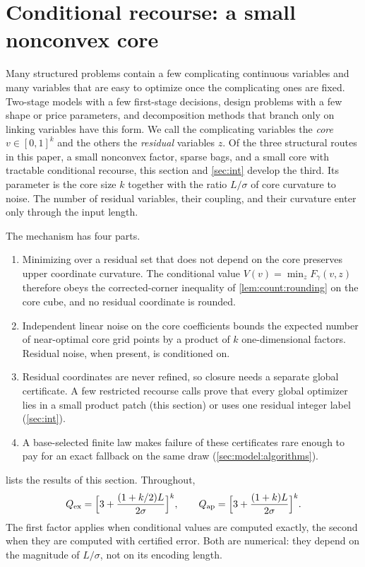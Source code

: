 \section{Conditional recourse: a small nonconvex core}\label{sec:rec}

Many structured problems contain a few complicating continuous variables
and many variables that are easy to optimize once the complicating ones are
fixed. Two-stage models with a few first-stage decisions, design problems
with a few shape or price parameters, and decomposition methods that branch
only on linking variables have this form. We call the complicating variables
the \emph{core} $v\in[0,1]^k$ and the others the \emph{residual} variables
$z$. Of the three structural routes in this paper, a small nonconvex factor,
sparse bags, and a small core with tractable conditional recourse, this
section and \cref{sec:int} develop the third. Its parameter is the core
size $k$ together with the ratio $L/\sigma$ of core curvature to noise. The
number of residual variables, their coupling, and their curvature enter only
through the input length.

The mechanism has four parts.
\begin{enumerate}[label=(\roman*)]
\item Minimizing over a residual set that does not depend on the core
preserves upper coordinate curvature. The conditional value
$V(v)=\min_zF_\gamma(v,z)$ therefore obeys the corrected-corner inequality
of \cref{lem:count:rounding} on the core cube, and no residual coordinate is
rounded.
\item Independent linear noise on the core coefficients bounds the expected
number of near-optimal core grid points by a product of $k$ one-dimensional
factors. Residual noise, when present, is conditioned on.
\item Residual coordinates are never refined, so closure needs a separate
global certificate. A few restricted recourse calls prove that every global
optimizer lies in a small product patch (this section) or uses one residual
integer label (\cref{sec:int}).
\item A base-selected finite law makes failure of these certificates rare
enough to pay for an exact fallback on the same draw
(\cref{sec:model:algorithms}).
\end{enumerate}
 lists the results of this section. Throughout,
\begin{equation}\label{eq:rec:Q}
 Q_{\rm ex}=\Bigl[3+\frac{(1+k/2)L}{2\sigma}\Bigr]^k,
 \qquad
 Q_{\rm ap}=\Bigl[3+\frac{(1+k)L}{2\sigma}\Bigr]^k .
\end{equation}
The first factor applies when conditional values are computed exactly, the
second when they are computed with certified error. Both are numerical:
they depend on the magnitude of $L/\sigma$, not on its encoding length.

